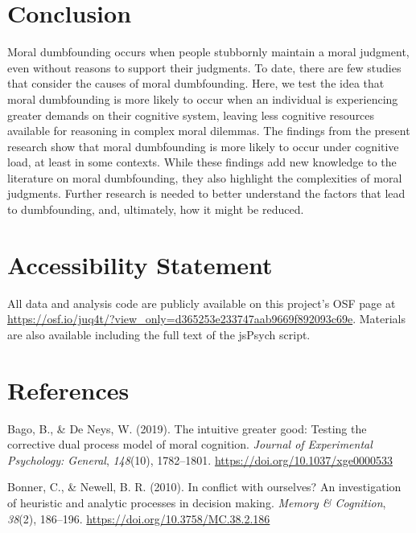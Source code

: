 \documentclass[
  american,
  man,floatsintext]{apa7}
\begin{document}
\hypertarget{conclusion}{%
\section{Conclusion}\label{conclusion}}

Moral dumbfounding occurs when people stubbornly maintain a moral judgment, even without reasons to support their judgments. To date, there are few studies that consider the causes of moral dumbfounding. Here, we test the idea that moral dumbfounding is more likely to occur when an individual is experiencing greater demands on their cognitive system, leaving less cognitive resources available for reasoning in complex moral dilemmas. The findings from the present research show that moral dumbfounding is more likely to occur under cognitive load, at least in some contexts. While these findings add new knowledge to the literature on moral dumbfounding, they also highlight the complexities of moral judgments. Further research is needed to better understand the factors that lead to dumbfounding, and, ultimately, how it might be reduced.

\hypertarget{accessibility-statement}{%
\section{Accessibility Statement}\label{accessibility-statement}}

All data and analysis code are publicly available on this project's OSF page at \url{https://osf.io/juq4t/?view_only=d365253e233747aab9669f892093c69e}. Materials are also available including the full text of the jsPsych script.

\newpage

\hypertarget{references}{%
\section{References}\label{references}}

\setlength{\parindent}{-0.5in}
\setlength{\leftskip}{0.5in}
\setlength{\parskip}{8pt}

\hypertarget{refs}{}
\leavevmode\hypertarget{ref-bago_intuitive_2019}{}%
Bago, B., \& De Neys, W. (2019). The intuitive greater good: Testing the corrective dual process model of moral cognition. \emph{Journal of Experimental Psychology: General}, \emph{148}(10), 1782--1801. \url{https://doi.org/10.1037/xge0000533}

\leavevmode\hypertarget{ref-bonner_conflict_2010}{}%
Bonner, C., \& Newell, B. R. (2010). In conflict with ourselves? An investigation of heuristic and analytic processes in decision making. \emph{Memory \& Cognition}, \emph{38}(2), 186--196. \url{https://doi.org/10.3758/MC.38.2.186}
\end{document}

